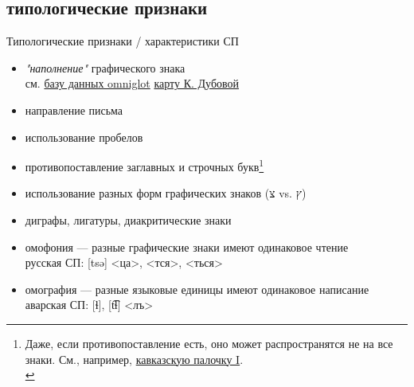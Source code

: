 \subsection{типологические признаки}
\begin{frame}{Типологические признаки / характеристики СП}
\begin{itemize}
\item 	\textit{"наполнение"} графического знака \\
см. \hfill  \href{http://www.omniglot.com/}{базу данных omniglot} \hfill \href{https://www.google.com/maps/d/viewer?hl=ru&hl=ru&authuser=0&authuser=0&mid=1sUaEqTAoyl9OV4cxYtipA23lACg}{карту К. Дубовой}
\pause
\item направление письма
\item использование пробелов
\item противопоставление заглавных и строчных букв\footnote[frame]{Даже, если противопоставление есть, оно может распространятся не на все знаки. См., например, \href{https://en.wikipedia.org/wiki/Palochka}{кавказскую палочку I}.\\}
\item использование разных форм графических знаков ({\HEB צ} vs. {\HEB ץ})
\item диграфы, лигатуры, диакритические знаки
\item омофония — разные графические знаки имеют одинаковое чтение \smallskip\\
русская СП: \hfill [tsə] \hfill <ца>, <тся>, <ться>
\item омография  — разные языковые единицы имеют одинаковое написание \smallskip\\
аварская СП: \hfill [ɬ], [t͡ɬ] \hfill <лъ>
\end{itemize}
\end{frame}
